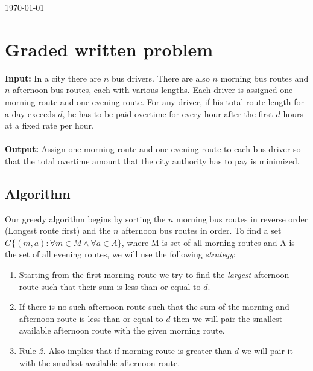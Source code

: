 \documentclass[8pt]{article}
\begin{document}
\hfill \small{\today} \\
\setlength{\fboxrule}{.5mm}\setlength{\fboxsep}{1.2mm}
\newlength{\boxlength}\setlength{\boxlength}{\textwidth}
\addtolength{\boxlength}{-4mm}
\begin{center}\end{center}
\vspace{5mm}

\section{Graded written problem}

\textbf{Input:} In a city there are $n$ bus drivers. There are also $n$ morning bus routes and $n$ afternoon bus routes, each with various lengths. Each driver is assigned one morning route
and one evening route. For any driver, if his total route length for a day exceeds $d$, he has to
be paid overtime for every hour after the first $d$ hours at a fixed rate per hour.
\\ \\
\textbf{Output:} Assign one morning route and one evening route to each bus driver so that the total overtime amount that the city authority has to pay is minimized.

\subsection{Algorithm}
Our greedy algorithm begins by sorting the $n$ morning bus routes in reverse order (Longest route first) and the $n$ afternoon bus routes in order. To find a set $G\{(m,a): \forall m \in M \land \forall a \in A \}$, where M is set of all morning routes and A is the set of all evening routes, we will use the following \textit{strategy}:
\begin{enumerate}
    \item Starting from the first morning route we try to find the \textit{largest} afternoon route such that their sum is less than or equal to $d$. 
    \item If there is no such afternoon route such that the sum of the morning and afternoon route is less than or equal to $d$ then we will pair the smallest available afternoon route with the given morning route.
    \item Rule \textit{2.} Also implies that if morning route is greater than $d$ we will pair it with the smallest available afternoon route.
\end{enumerate}
\end{document}
